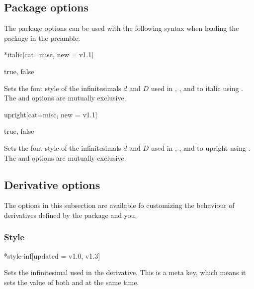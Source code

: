 \subsection{Package options}
The package options can be used with the following syntax when loading the package in the preamble:
\begin{center}
	\ttfamily\small
\end{center}

\begin{option}*{italic}[cat=misc, new = v1.1]
	\begin{values}[default = false]
		true, false
	\end{values}
	Sets the font style of the infinitesimals $d$ and $D$ used in , ,  and  to italic using . The  and  options are mutually exclusive.
\end{option}

\begin{option}{upright}[cat=misc, new = v1.1]
	\begin{values}[default = true]
		true, false
	\end{values}
	Sets the font style of the infinitesimals $d$ and $D$ used in , ,  and  to upright using . The  and  options are mutually exclusive.
\end{option}

\subsection{Derivative options} \label{ssec:options_dv}
The options in this subsection are available fo  customizing the behaviour of derivatives defined by the package and you.%

\subsubsection*{Style}

\begin{option}*{style-inf}[updated = {v1.0, v1.3}]
	\begin{values}[default = d]
	\end{values}
	Sets the infinitesimal used in the derivative. This is a meta key, which means it sets the value of both  and  at the same time.
	\begin{example}
	\end{example}
\end{option}

